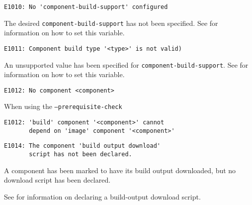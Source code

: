\begin{footnotesize}
\begin{verbatim}
E1010: No 'component-build-support' configured
\end{verbatim}
\end{footnotesize}

The desired \texttt{component-build-support} has not been specified.
See  for information on how to
set this variable.

\begin{footnotesize}
\begin{verbatim}
E1011: Component build type '<type>' is not valid)
\end{verbatim}
\end{footnotesize}

An unsupported value has been specified for
\texttt{component-build-support}.  See
 for information on how to set
this variable.

\begin{footnotesize}
\begin{verbatim}
E1012: No component <component>
\end{verbatim}
\end{footnotesize}

When using the \texttt{--prerequisite-check}

\begin{footnotesize}
\begin{verbatim}
E1012: 'build' component '<component>' cannot
       depend on 'image' component '<component>'
\end{verbatim}
\end{footnotesize}


\begin{footnotesize}
\begin{verbatim}
E1014: The component 'build output download'
       script has not been declared.
\end{verbatim}
\end{footnotesize}

A component has been marked to have its build output downloaded, but
no download script has been declared.

See  for
information on declaring a build-output download script.

